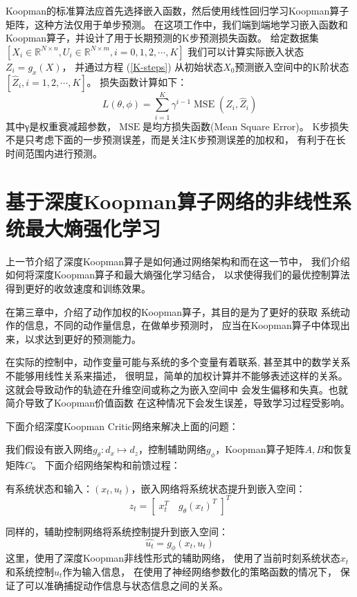 \documentclass[AutoFakeBold]{LZUThesis}
\begin{document}
Koopman的标准算法应首先选择嵌入函数，然后使用线性回归学习Koopman算子矩阵，这种方法仅用于单步预测。
在这项工作中，我们端到端地学习嵌入函数和Koopman算子，并设计了用于长期预测的K步预测损失函数。
给定数据集
$[ X_i \in \mathbb{R}^{N \times n}, U_i \in \mathbb{R}^{N \times m}, i = 0, 1, 2, \cdots, K]$
我们可以计算实际嵌入状态$Z_i = g_x(X)$，
并通过方程 (\ref{K-steps}) 从初始状态$X_0$预测嵌入空间中的K阶状态$[ \hat{Z}_i, i = 1, 2, \cdots, K]$。
损失函数计算如下：
\begin{equation}
  L(\theta, \phi)=\sum_{i=1}^{K} \gamma^{i-1} 
  \operatorname{MSE}\left(Z_{i}, \hat{Z}_{i}\right)
\end{equation}
其中γ是权重衰减超参数，$\operatorname{MSE}$是均方损失函数(Mean Square Error)。
K步损失不是只考虑下面的一步预测误差，而是关注K步预测误差的加权和，
有利于在长时间范围内进行预测。

\section{基于深度Koopman算子网络的非线性系统最大熵强化学习}
上一节介绍了深度Koopman算子是如何通过网络架构和而在这一节中，
我们介绍如何将深度Koopman算子和最大熵强化学习结合，
以求使得我们的最优控制算法得到更好的收敛速度和训练效果。

在第三章中，介绍了动作加权的Koopman算子，其目的是为了更好的获取
系统动作的信息，不同的动作量信息，在做单步预测时，
应当在Koopman算子中体现出来，以求达到更好的预测能力。

在实际的控制中，动作变量可能与系统的多个变量有着联系,
甚至其中的数学关系不能够用线性关系来描述，
很明显，简单的加权计算并不能够表述这样的关系。
这就会导致动作的轨迹在升维空间或称之为嵌入空间中
会发生偏移和失真。也就简介导致了Koopman价值函数
在这种情况下会发生误差，导致学习过程受影响。

下面介绍深度Koopman Critic网络来解决上面的问题：

我们假设有嵌入网络$g_\theta : d_x \mapsto d_z$，控制辅助网络$g_\phi$，Koopman算子矩阵$A, B$和恢复矩阵$C$。
下面介绍网络架构和前馈过程：

有系统状态和输入：$(x_t, u_t)$，嵌入网络将系统状态提升到嵌入空间：
\begin{equation}
  z_t = [\; x_t^T \quad g_\theta(x_t)^T \;]^T
\end{equation}

同样的，辅助控制网络将系统控制提升到嵌入空间：
\begin{equation}
  \hat{u_t} = g_\phi(x_t, u_t)
\end{equation}
这里，使用了深度Koopman非线性形式的辅助网络，
使用了当前时刻系统状态$x_t$和系统控制$u_t$作为输入信息，
在使用了神经网络参数化的策略函数的情况下，
保证了可以准确捕捉动作信息与状态信息之间的关系。
\end{document}

